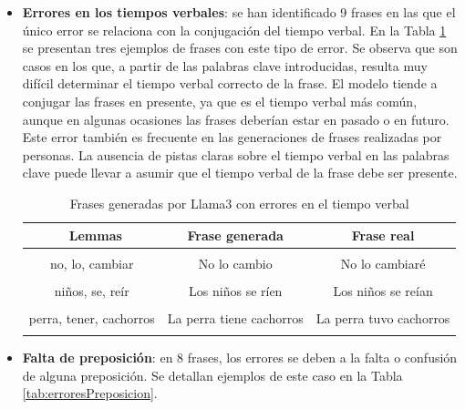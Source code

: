 \documentclass[11pt,spanish,listoffigures,listoftables]{tfgetsinf}
\begin{document}
\begin{itemize}
	\item \textbf{Errores en los tiempos verbales}: se han identificado 9 frases en las que el único error se relaciona con la conjugación del tiempo verbal. En la Tabla \ref{tab:erroresTiempoVerbal} se presentan tres ejemplos de frases con este tipo de error. Se observa que son casos en los que, a partir de las palabras clave introducidas, resulta muy difícil determinar el tiempo verbal correcto de la frase. El modelo tiende a conjugar las frases en presente, ya que es el tiempo verbal más común, aunque en algunas ocasiones las frases deberían estar en pasado o en futuro. Este error también es frecuente en las generaciones de frases realizadas por personas. La ausencia de pistas claras sobre el tiempo verbal en las palabras clave puede llevar a asumir que el tiempo verbal de la frase debe ser presente.

\begin{table}[!h]
\caption{Frases generadas por Llama3 con errores en el tiempo verbal}
\begin{center}
\begin{tabular}{ c | c | c }
	\ Lemmas & Frase generada & Frase real \\
	\hline
	\hline
	 & & \\
	 no, lo, cambiar & No lo cambio & No lo cambiaré  \\
	 & & \\
	niños, se, reír & Los niños se ríen & Los niños se reían\\
	 & & \\
	perra, tener, cachorros & La perra tiene cachorros & La perra tuvo cachorros \\
	 & & \\

\end{tabular}
\end{center}
\label{tab:erroresTiempoVerbal}
\end{table}

	\item \textbf{Falta de preposición}: en 8 frases, los errores se deben a la falta o confusión de alguna preposición. Se detallan ejemplos de este caso en la Tabla \ref{tab:erroresPreposicion}.


\end{itemize}
\end{document}
